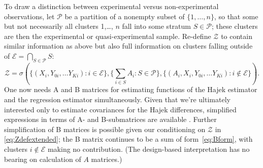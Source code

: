 To draw a distinction between experimental versus non-experimental
observations, let $\mathcal{P}$ be a partition of a nonempty subset of
$\{1, \ldots, n\}$, so that some but not necessarily all clusters
1,\ldots, $n$ fall into some stratum $S \in
\mathcal{P}$; these clusters are then the experimental or
quasi-experimental sample. Re-define $\mathcal{Z}$ to contain similar information
as above but also full information on clusters falling outside of
$\mathcal{E} = \bigcap_{S \in \mathcal{P}}S$: 
\begin{equation} \label{eq:Zdefextended}
  \mathcal{Z} = \sigma\left(\{(X_i, Y_{0i}, \ldots Y_{Ki}): i \in \mathcal{E}\}, \{\sum_{i
    \in S} A_i : S  \in \mathcal{P}\} , \{(A_{i}, X_i, Y_{0i}, \ldots
  Y_{Ki}): i \not\in\mathcal{E}\}\right).
\end{equation}
One now needs A and B matrices for estimating functions of the Hajek
estimator and the regression estimator simultaneously.  Given that
we're ultimately interested only to estimate covariances for the Hajek
differences, simplified expressions in terms of A- and B-submatrices
are available \citep[e.g.][p.373 of \S~A.6.6.]{carroll2006measurement}.  Further
simplification of B matrices is possible given our conditioning on
$\mathcal{Z}$ in \eqref{eq:Zdefextended}; the B matrix continues to be
a sum of form~\eqref{eq:Bform}, with clusters $i\not\in \mathcal{E}$
making no contribution. (The design-based interpretation has no bearing on
calculation of \(A\) matrices.)

